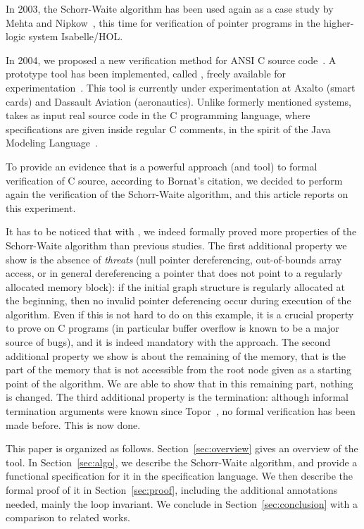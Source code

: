 
In 2003, the Schorr-Waite algorithm has been used again as a case
study by Mehta and Nipkow~\cite{mehta03cade}, this time for
verification of pointer programs in the higher-logic system
Isabelle/HOL. 

In 2004, we proposed a new verification method for ANSI
C source code~\cite{filliatre04icfem}.  A prototype tool has been
implemented, called \caduceus{}, freely available for
experimentation~\cite{Caduceus}. This tool is currently under
experimentation at Axalto (smart cards) and Dassault Aviation
(aeronautics). Unlike formerly mentioned systems, \caduceus{} takes as
input real source code in the C programming language, where
specifications are given inside regular C comments, in the spirit of
the Java Modeling Language~\cite{leavens00jml}. 

To provide an evidence that \caduceus{} is a powerful approach (and
tool) to formal verification of C source, according to Bornat's
citation, we decided to perform again the verification of the
Schorr-Waite algorithm, and this article reports
on this experiment.

It has to be noticed that with \caduceus{}, we indeed formally proved
more properties of the Schorr-Waite algorithm than previous studies.
The first additional property we show is the absence of \emph{threats}
(null pointer dereferencing, out-of-bounds array access, or in general
dereferencing a pointer that does not point to a regularly allocated
memory block): if the initial graph structure is regularly allocated
at the beginning, then no invalid pointer deferencing occur during
execution of the algorithm. Even if this is not hard to do on this
example, it is a crucial property to prove on C programs (in
particular buffer overflow is known to be a major source of bugs), and
it is indeed mandatory with the \caduceus{} approach. The second
additional property we show is about the remaining of the memory, that
is the part of the memory that is not accessible from the root node
given as a starting point of the algorithm. We are able to show that
in this remaining part, nothing is changed. The third additional
property is the termination: although informal termination arguments
were known since Topor~\cite{topor79acta}, %
no formal
verification has been made before. This is now done.

This paper is organized as follows.  Section~\ref{sec:overview} gives
an overview of the \caduceus{} tool.  In Section~\ref{sec:algo}, we
describe the Schorr-Waite algorithm, and provide a functional
specification for it in the \caduceus{} specification language.
We then describe the formal proof of it in Section~\ref{sec:proof},
including the additional annotations needed, mainly the loop
invariant.  We conclude in Section~\ref{sec:conclusion} with a
comparison to related works.





